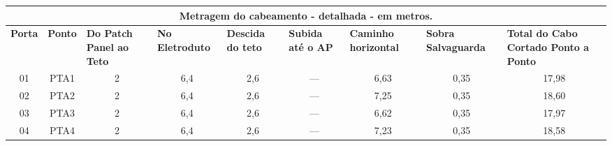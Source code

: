 \documentclass[	DIV=calc,%
							paper=a4,%
							fontsize=12pt,%
							onecolumn]{scrartcl}	 					%
\begin{document}
\centering
\begin{tabular}{|c|c|c|c|c|c|c|c|c|}
	\hline
	\multicolumn{9}{|c|}{\textbf{Metragem do cabeamento - detalhada - em metros.}}                                                                                                                                                                                                                                                                                                                                        \\ \hline
	\textbf{Porta}     & \textbf{Ponto}     & \multicolumn{1}{l|}{\textbf{Do Patch Panel ao Teto}} & \multicolumn{1}{l|}{\textbf{No Eletroduto}} & \multicolumn{1}{l|}{\textbf{Descida do teto}} & \multicolumn{1}{l|}{\textbf{Subida até o AP}} & \multicolumn{1}{l|}{\textbf{Caminho horizontal}} & \multicolumn{1}{l|}{\textbf{Sobra Salvaguarda}} & \multicolumn{1}{l|}{\textbf{Total do Cabo Cortado Ponto a Ponto}} \\ \hline
	01                 & PTA1               & 2                                                    & 6,4                                         & 2,6                                           & ---                                           & 6,63                                             & 0,35                                            & 17,98                                                             \\ \hline
	02                 & PTA2               & 2                                                    & 6,4                                         & 2,6                                           & ---                                           & 7,25                                             & 0,35                                            & 18,60                                                             \\ \hline
	03                 & PTA3               & 2                                                    & 6,4                                         & 2,6                                           & ---                                           & 6,62                                             & 0,35                                            & 17,97                                                             \\ \hline
	04                 & PTA4               & 2                                                    & 6,4                                         & 2,6                                           & ---                                           & 7,23                                             & 0,35                                            & 18,58                                                             \\ \hline

\end{tabular}
\end{document}
